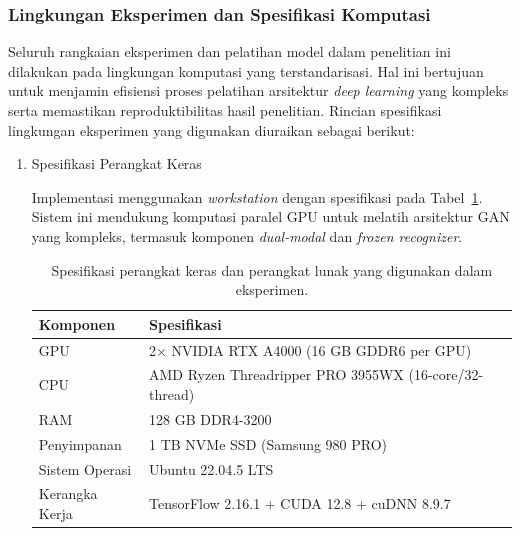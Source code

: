 \subsubsection{Lingkungan Eksperimen dan Spesifikasi Komputasi}
\label{subsec:lingkungan-eksperimen}

Seluruh rangkaian eksperimen dan pelatihan model dalam penelitian ini dilakukan pada lingkungan komputasi yang terstandarisasi. Hal ini bertujuan untuk menjamin efisiensi proses pelatihan arsitektur \textit{deep learning} yang kompleks serta memastikan reproduktibilitas hasil penelitian. Rincian spesifikasi lingkungan eksperimen yang digunakan diuraikan sebagai berikut:

\begin{enumerate}[label=\arabic*., leftmargin=*, wide=0pt, itemsep=1em]
    \item Spesifikasi Perangkat Keras

Implementasi menggunakan \textit{workstation} dengan spesifikasi pada Tabel~\ref{tab:hardware-specs-actual}. Sistem ini mendukung komputasi paralel GPU untuk melatih arsitektur GAN yang kompleks, termasuk komponen \textit{dual-modal} dan \textit{frozen recognizer}.

\begin{table}[H]
  \caption[Lingkungan eksperimen]{Spesifikasi perangkat keras dan perangkat lunak yang digunakan dalam eksperimen.}
  \label{tab:hardware-specs-actual}
  \normalsize
  \centering
  \begin{tabular}{|l|l|}
    \hline
    \textbf{Komponen} & \textbf{Spesifikasi}                                  \\
    \hline
    GPU               & 2$\times$ NVIDIA RTX A4000 (16 GB GDDR6 per GPU)      \\
    \hline
    CPU               & AMD Ryzen Threadripper PRO 3955WX (16-core/32-thread) \\
    \hline
    RAM               & 128 GB DDR4-3200                                      \\
    \hline
    Penyimpanan       & 1 TB NVMe SSD (Samsung 980 PRO)                       \\
    \hline
    Sistem Operasi    & Ubuntu 22.04.5 LTS                                    \\
    \hline
    Kerangka Kerja    & TensorFlow 2.16.1 + CUDA 12.8 + cuDNN 8.9.7           \\
    \hline
  \end{tabular}
\end{table}



\end{enumerate}
